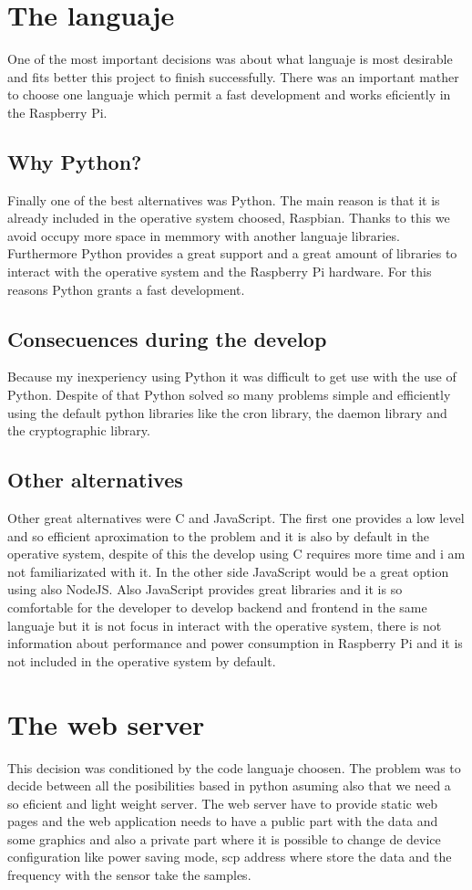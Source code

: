 	\section{The languaje}
	One of the most important decisions was about what languaje is most desirable and fits better this project to finish successfully. There was an important mather to choose one languaje which permit a fast development and works eficiently in the Raspberry Pi.
		\subsection{Why Python?}
		Finally one of the best alternatives was Python. The main reason is that it is already included in the operative system choosed, Raspbian. Thanks to this we avoid occupy more space in memmory with another languaje libraries. 
		Furthermore Python provides a great support and a great amount of libraries to interact with the operative system and the Raspberry Pi hardware. 
		For this reasons Python grants a fast development.
		\subsection{Consecuences during the develop}
		Because my inexperiency using Python it was difficult to get use with the use of Python. Despite of that Python solved so many problems simple and efficiently using the default python libraries like the cron library, the daemon library and the cryptographic library.
		\subsection{Other alternatives}
		Other great alternatives were C and JavaScript. The first one provides a low level and so efficient aproximation to the problem and it is also by default in the operative system, despite of this the develop using C requires more time and i am not familiarizated with it. In the other side JavaScript would be a great option using also NodeJS. Also JavaScript provides great libraries and it is so comfortable for the developer to develop backend and frontend in the same languaje but it is not focus in interact with the operative system, there is not information about performance and power consumption in Raspberry Pi and it is not included in the operative system by default.
	\section{The web server}
		This decision was conditioned by the code languaje choosen. The problem was to decide between all the posibilities based in python asuming also that we need a so eficient and light weight server.
		The web server have to provide static web pages and the web application needs to have a public part with the data and some graphics and also a private part where it is possible to change de device configuration like power saving mode, scp address where store the data and the frequency with the sensor take the samples.
